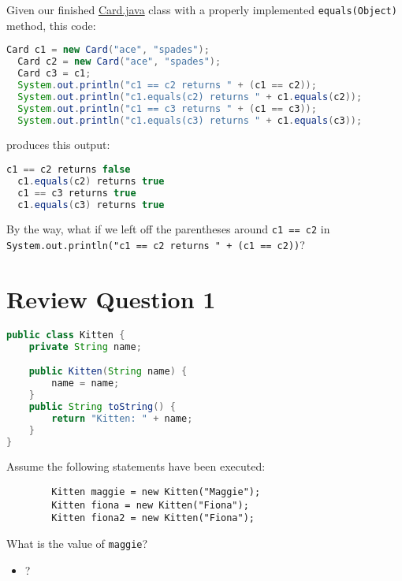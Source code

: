 \documentclass{article}
\begin{document}
Given our finished \href{https://github.com/cs1331/cs1331.github.io/blob/master/code/classes/Card.java}{Card.java} class with a properly implemented {\tt equals(Object)} method, this code:

\begin{lstlisting}[language=Java]
  Card c1 = new Card("ace", "spades");
  Card c2 = new Card("ace", "spades");
  Card c3 = c1;
  System.out.println("c1 == c2 returns " + (c1 == c2));
  System.out.println("c1.equals(c2) returns " + c1.equals(c2));
  System.out.println("c1 == c3 returns " + (c1 == c3));
  System.out.println("c1.equals(c3) returns " + c1.equals(c3));
\end{lstlisting}

produces this output:

\begin{lstlisting}[language=Java]
  c1 == c2 returns false
  c1.equals(c2) returns true
  c1 == c3 returns true
  c1.equals(c3) returns true
\end{lstlisting}

{\small By the way, what if we left off the parentheses around {\tt c1 == c2} in  {\tt System.out.println("c1 == c2 returns " + (c1 == c2))}}?





\section{Review Question 1}

\begin{lstlisting}[language=Java]
public class Kitten {
    private String name;

    public Kitten(String name) {
        name = name;
    }
    public String toString() {
        return "Kitten: " + name;
    }
}
\end{lstlisting}

Assume the following statements have been executed:

\begin{lstlisting}
        Kitten maggie = new Kitten("Maggie");
        Kitten fiona = new Kitten("Fiona");
        Kitten fiona2 = new Kitten("Fiona");
\end{lstlisting}

What is the value of {\tt maggie}?
\begin{itemize}
\itemsep0em
\item ?
\end{itemize}
\end{document}

